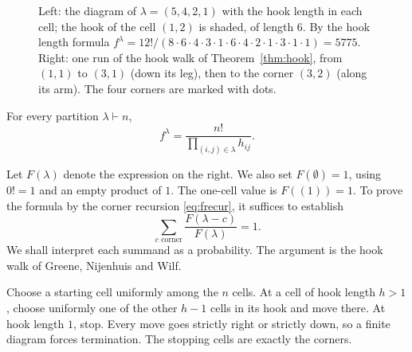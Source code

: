 \begin{figure}[ht]
\centering
{}
\caption{Left: the diagram of $\lambda=(5,4,2,1)$ with the hook length in each cell; the hook of the cell $(1,2)$ is shaded, of length $6$. By the hook length formula $f^\lambda=12!/(8\cdot6\cdot4\cdot3\cdot1\cdot6\cdot4\cdot2\cdot1\cdot3\cdot1\cdot1)=5775$.
Right: one run of the hook walk of Theorem~\ref{thm:hook}, from $(1,1)$ to $(3,1)$ (down its leg), then to the corner $(3,2)$ (along its arm). The four corners are marked with dots.}
\label{fig:hooks}
\end{figure}

\begin{theorem}\label{thm:hook}
For every partition $\lambda\vdash n$,
\[
f^\lambda=\frac{n!}{\prod_{(i,j)\in\lambda}h_{ij}}.
\]
\end{theorem}

Let $F(\lambda)$ denote the expression on the right. We also set $F(\emptyset)=1$, using $0!=1$ and an empty product of $1$. The one-cell value is $F((1))=1$. To prove the formula by the corner recursion \eqref{eq:frecur}, it suffices to establish
\begin{equation}\label{eq:hooksum}
\sum_{c\text{ corner}}\frac{F(\lambda-c)}{F(\lambda)}=1.
\end{equation}
We shall interpret each summand as a probability. The argument is the hook walk of Greene, Nijenhuis and Wilf.

Choose a starting cell uniformly among the $n$ cells. At a cell of hook length $h>1$, choose uniformly one of the other $h-1$ cells in its hook and move there. At hook length $1$, stop. Every move goes strictly right or strictly down, so a finite diagram forces termination. The stopping cells are exactly the corners.

